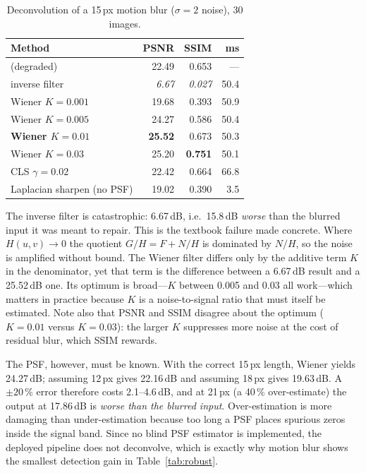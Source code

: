 \documentclass[conference,10pt]{IEEEtran}
\newcommand{\hdr}[1]{\textbf{#1}}
\begin{document}
\begin{table}[!t]
\caption{Deconvolution of a 15\,px motion blur ($\sigma{=}2$ noise), 30 images.}
\label{tab:deblur}
\centering
\scriptsize
\begin{tabular}{@{}lrrr@{}}
\toprule
\hdr{Method} & \hdr{PSNR} & \hdr{SSIM} & \hdr{ms} \\
\midrule
(degraded)                  & 22.49 & 0.653 & --- \\
inverse filter              & \textit{6.67} & \textit{0.027} & 50.4 \\
Wiener $K{=}0.001$          & 19.68 & 0.393 & 50.9 \\
Wiener $K{=}0.005$          & 24.27 & 0.586 & 50.4 \\
\textbf{Wiener $K{=}0.01$}  & \textbf{25.52} & 0.673 & 50.3 \\
Wiener $K{=}0.03$           & 25.20 & \textbf{0.751} & 50.1 \\
CLS $\gamma{=}0.02$         & 22.42 & 0.664 & 66.8 \\
Laplacian sharpen (no PSF)  & 19.02 & 0.390 & 3.5 \\
\bottomrule
\end{tabular}
\end{table}

The inverse filter is catastrophic: 6.67\,dB, i.e.\ 15.8\,dB \emph{worse} than
the blurred input it was meant to repair. This is the textbook failure made
concrete. Where $H(u,v)\to 0$ the quotient $G/H = F + N/H$ is dominated by
$N/H$, so the noise is amplified without bound. The Wiener filter differs only
by the additive term $K$ in the denominator, yet that term is the difference
between a 6.67\,dB result and a 25.52\,dB one. Its optimum is broad---$K$
between 0.005 and 0.03 all work---which matters in practice because $K$ is a
noise-to-signal ratio that must itself be estimated. Note also that PSNR and
SSIM disagree about the optimum ($K{=}0.01$ versus $K{=}0.03$): the larger $K$
suppresses more noise at the cost of residual blur, which SSIM rewards.


The PSF, however, must be known.
With the correct 15\,px length, Wiener yields 24.27\,dB; assuming 12\,px gives
22.16\,dB and assuming 18\,px gives 19.63\,dB. A $\pm20\,\%$ error therefore
costs 2.1--4.6\,dB, and at 21\,px (a 40\,\% over-estimate) the output at
17.86\,dB is \emph{worse than the blurred input}. Over-estimation is more
damaging than under-estimation because too long a PSF places spurious zeros
inside the signal band. Since no blind PSF estimator is implemented, the
deployed pipeline does not deconvolve, which is exactly why motion blur shows
the smallest detection gain in Table~\ref{tab:robust}.
\end{document}
